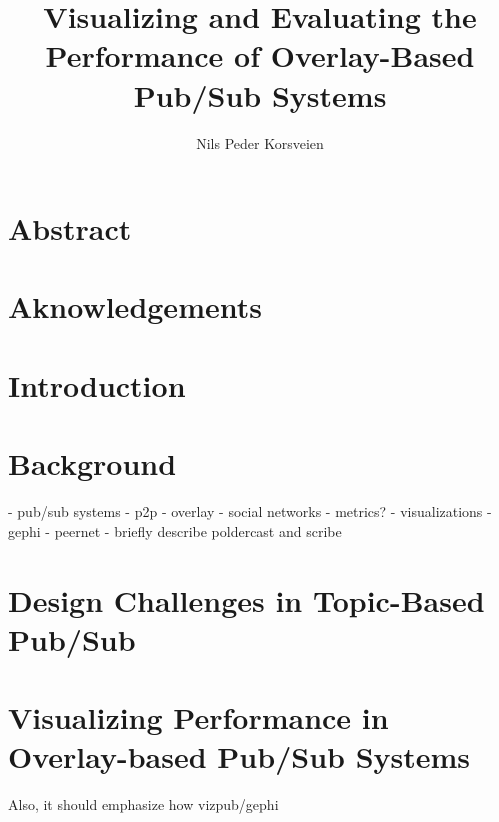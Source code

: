 \documentclass[UKenglish, a4paper]{ifimaster}
\title{Visualizing and Evaluating the Performance of Overlay-Based Pub/Sub Systems}
\subtitle{}
\author{Nils Peder Korsveien}
\begin{document}
\ififorside{}
\frontmatter{}
\maketitle{}

\chapter*{Abstract}
\tableofcontents{}
\listoffigures{}
\listoftables{}
\chapter*{Aknowledgements}
\mainmatter{}

\chapter{Introduction}


\chapter{Background}
- pub/sub systems
- p2p
- overlay
- social networks
- metrics?
- visualizations
- gephi
- peernet
- briefly describe poldercast and scribe

\label{ch:background}


\chapter{Design Challenges in Topic-Based Pub/Sub}
\label{ch:design-challenges}


\chapter{Visualizing Performance in Overlay-based Pub/Sub Systems}
 Also, it should emphasize how vizpub/gephi
\label{ch:metrics}

\end{document}
